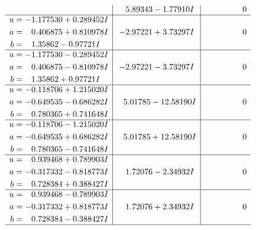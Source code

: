 \documentclass[1p]{elsarticle_modified}
\theoremstyle{definition}
\begin{document}
$$\begin{array}{c|c|c}
 & \phantom{-}5.89343 - 1.77910 I & \phantom{-0.000000 } 0 \\ \hline\begin{aligned}
u &= -1.177530 + 0.289452 I \\
a &= \phantom{-}0.406875 + 0.810978 I \\
b &= \phantom{-}1.35862 - 0.97721 I\end{aligned}
 & -2.97221 + 3.73297 I & \phantom{-0.000000 } 0 \\ \hline\begin{aligned}
u &= -1.177530 - 0.289452 I \\
a &= \phantom{-}0.406875 - 0.810978 I \\
b &= \phantom{-}1.35862 + 0.97721 I\end{aligned}
 & -2.97221 - 3.73297 I & \phantom{-0.000000 } 0 \\ \hline\begin{aligned}
u &= -0.118706 + 1.215020 I \\
a &= -0.649535 - 0.686282 I \\
b &= \phantom{-}0.780365 + 0.741648 I\end{aligned}
 & \phantom{-}5.01785 - 12.58190 I & \phantom{-0.000000 } 0 \\ \hline\begin{aligned}
u &= -0.118706 - 1.215020 I \\
a &= -0.649535 + 0.686282 I \\
b &= \phantom{-}0.780365 - 0.741648 I\end{aligned}
 & \phantom{-}5.01785 + 12.58190 I & \phantom{-0.000000 } 0 \\ \hline\begin{aligned}
u &= \phantom{-}0.939468 + 0.789903 I \\
a &= -0.317332 - 0.818773 I \\
b &= \phantom{-}0.728384 + 0.388427 I\end{aligned}
 & \phantom{-}1.72076 - 2.34932 I & \phantom{-0.000000 } 0 \\ \hline\begin{aligned}
u &= \phantom{-}0.939468 - 0.789903 I \\
a &= -0.317332 + 0.818773 I \\
b &= \phantom{-}0.728384 - 0.388427 I\end{aligned}
 & \phantom{-}1.72076 + 2.34932 I & \phantom{-0.000000 } 0\\
 \hline 
 \end{array}$$\newpage$$\begin{array}{c|c|c}  

\end{array}$$
\end{document}
